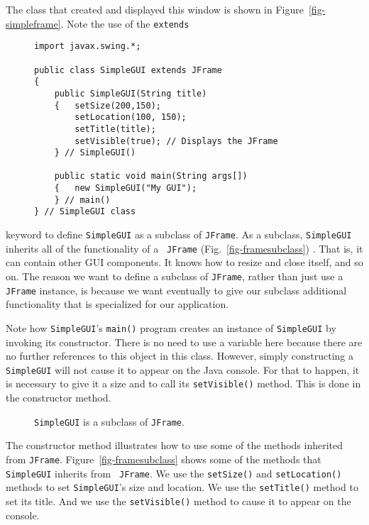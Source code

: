 The class that created and displayed this window is shown in
Figure~\ref{fig-simpleframe}.  Note the use of the {\tt extends}
\begin{figure}[h!]
\jjjprogstart
\begin{jjjlisting}
\begin{lstlisting}
import javax.swing.*;

public class SimpleGUI extends JFrame 
{
    public SimpleGUI(String title) 
    {   setSize(200,150);
        setLocation(100, 150);
        setTitle(title);
        setVisible(true); // Displays the JFrame
    } // SimpleGUI()

    public static void main(String args[]) 
    {   new SimpleGUI("My GUI");
    } // main()
} // SimpleGUI class
\end{lstlisting}
\end{jjjlisting}
\end{figure}
keyword to define {\tt SimpleGUI} as a subclass of {\tt JFrame}.  As a
subclass, {\tt SimpleGUI} inherits all of the functionality of a {\tt
JFrame} (Fig.~\ref{fig-framesubclass}) . That is, it can contain
other GUI components. It knows how to resize and close itself, and so
on. The reason we want to define a subclass of {\tt JFrame}, rather
than just use a {\tt JFrame} instance, is because we want eventually
to give our subclass additional functionality that is specialized for
our application.



Note how {\tt SimpleGUI}'s {\tt main()} program  creates an
instance of {\tt SimpleGUI} by invoking its constructor. There is no
need to use a variable here because there are no further references
to this object in this class.  However, simply
constructing a {\tt SimpleGUI} will not cause it to
appear on the Java console. For that to happen, it is necessary
to give it a size and to call its {\tt setVisible()} method. This is
done in the constructor method.

\begin{figure}[h!]
{{\tt SimpleGUI} is a subclass of {\tt JFrame}.
\label{fig-framesubclass}
\label{pg-fig-framesubclass}}
\end{figure}

The constructor method illustrates how to use some of the methods
inherited from {\tt JFrame}.  Figure~\ref{fig-framesubclass} shows
some of the methods that {\tt SimpleGUI} inherits from {\tt
JFrame}. We use the {\tt setSize()} and {\tt setLocation()} methods to
set {\tt SimpleGUI}'s size and location. We use the {\tt setTitle()}
method to set its title. And we use the {\tt setVisible()} method to cause
it to appear on the console.

